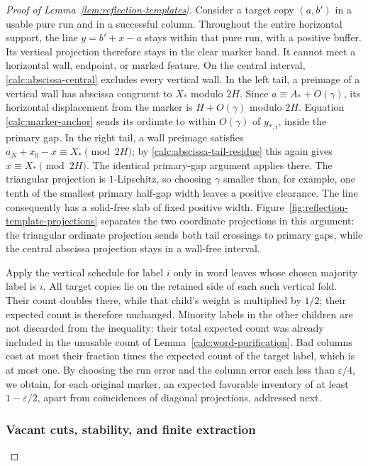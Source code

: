 \begin{proof}[Proof of Lemma~\ref{lem:reflection-templates}]
Consider a target copy $(a,b')$ in a usable pure run and in a
successful column. Throughout the entire horizontal support, the
line $y=b'+x-a$ stays within that pure run, with a positive
buffer. Its vertical projection therefore stays in the clear
marker band. It cannot meet a horizontal wall, endpoint, or marked
feature. On the central interval, \eqref{calc:abscissa-central}
excludes every vertical wall. In the left tail, a preimage of a
vertical wall has abscissa congruent to $X_*$ modulo $2H$. Since
$a\equiv A_*+O(\gamma)$, its horizontal displacement from the
marker is $H+O(\gamma)$ modulo $2H$. Equation
\eqref{calc:marker-anchor} sends its ordinate to within
$O(\gamma)$ of $y_{*,i}$, inside the primary gap. In the right
tail, a wall preimage satisfies
$a_N+x_0-x\equiv X_*\pmod{2H}$; by
\eqref{calc:abscissa-tail-residue} this again gives
$x\equiv X_*\pmod{2H}$. The identical primary-gap argument
applies there. The triangular projection is $1$-Lipschitz, so
choosing $\gamma$ smaller than, for example, one tenth of the
smallest primary half-gap width leaves a positive clearance.
The line consequently has a solid-free slab of fixed positive
width. Figure~\ref{fig:reflection-template-projections} separates the two
coordinate projections in this argument: the triangular ordinate
projection sends both tail crossings to primary gaps, while the central
abscissa projection stays in a wall-free interval.



Apply the vertical schedule for label $i$ only in word leaves
whose chosen majority label is $i$. All target copies lie on the
retained side of each such vertical fold. Their count doubles
there, while that child's weight is multiplied by $1/2$; their
expected count is therefore unchanged. Minority labels in the
other children are not discarded from the inequality: their total
expected count was already included in the unusable count of
Lemma~\ref{calc:word-purification}. Bad columns cost at most their
fraction times the expected count of the target label, which is
at most one. By choosing the run error and the column error each
less than $\varepsilon/4$, we obtain, for each original marker,
an expected favorable inventory of at least $1-\varepsilon/2$,
apart from coincidences of diagonal projections, addressed next.

\subsubsection{Vacant cuts, stability, and finite extraction}


\end{proof}
